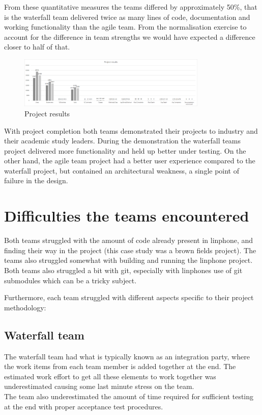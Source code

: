 \documentclass{sig-alternate-05-2015}
\begin{document}
From these quantitative measures the teams differed by approximately 50\%, that is the waterfall team delivered twice as many lines of code, documentation and working functionality than the agile team. From the normalisation exercise to account for the difference in team strengths we would have expected a difference closer to half of that. 

\begin{figure}[t!]
	\centering 
	\includegraphics[width=90mm]{Project results.png}
	\caption{Project results}
\end{figure}


With project completion both teams demonstrated their projects to industry and their academic study leaders. During the demonstration the waterfall teams project delivered more functionality and held up better under testing. On the other hand, the agile team project had a better user experience compared to the waterfall project, but contained an architectural weakness, a single point of failure in the design.

\section{Difficulties the teams encountered} 

Both teams struggled with the amount of code already present in linphone, and finding their way in the project (this case study was a brown fields project). The teams also struggled somewhat with building and running the linphone project. Both teams also struggled a bit with git, especially with linphones use of git submodules which can be a tricky subject.

Furthermore, each team struggled with different aspects specific to their project methodology:

\subsection{Waterfall team}
The waterfall team had what is typically known as an integration party, where the work items from each team member is added together at the end. The estimated work effort to get all these elements to work together was underestimated causing some last minute stress on the team.
\\ 
The team also underestimated the amount of time required for sufficient testing at the end with proper acceptance test procedures.
\end{document}
